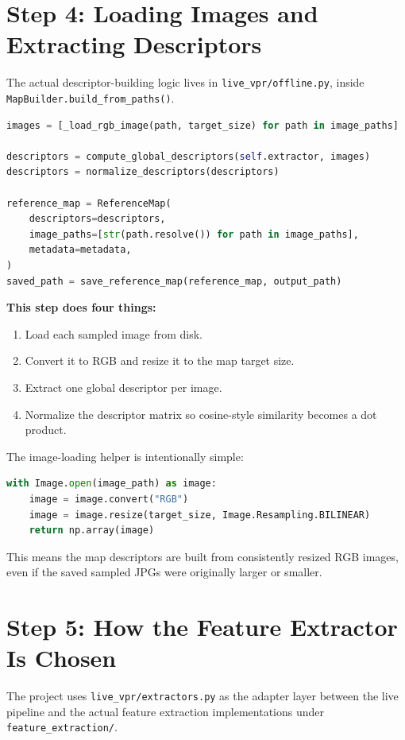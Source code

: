 \documentclass[11pt]{article}
\newcommand{\file}[1]{\texttt{#1}}
\newcommand{\code}[1]{\texttt{#1}}
\begin{document}
\section{Step 4: Loading Images and Extracting Descriptors}
The actual descriptor-building logic lives in \file{live\_vpr/offline.py}, inside \code{MapBuilder.build\_from\_paths()}.

\begin{lstlisting}[style=repo,language=Python,caption={Map building in \file{live\_vpr/offline.py}.}]
images = [_load_rgb_image(path, target_size) for path in image_paths]

descriptors = compute_global_descriptors(self.extractor, images)
descriptors = normalize_descriptors(descriptors)

reference_map = ReferenceMap(
    descriptors=descriptors,
    image_paths=[str(path.resolve()) for path in image_paths],
    metadata=metadata,
)
saved_path = save_reference_map(reference_map, output_path)
\end{lstlisting}

\textbf{This step does four things:}

\begin{enumerate}[leftmargin=*]
  \item Load each sampled image from disk.
  \item Convert it to RGB and resize it to the map target size.
  \item Extract one global descriptor per image.
  \item Normalize the descriptor matrix so cosine-style similarity becomes a dot product.
\end{enumerate}

The image-loading helper is intentionally simple:

\begin{lstlisting}[style=repo,language=Python,caption={Image preprocessing before descriptor extraction.}]
with Image.open(image_path) as image:
    image = image.convert("RGB")
    image = image.resize(target_size, Image.Resampling.BILINEAR)
    return np.array(image)
\end{lstlisting}

This means the map descriptors are built from consistently resized RGB images, even if the saved sampled JPGs were originally larger or smaller.

\section{Step 5: How the Feature Extractor Is Chosen}
The project uses \file{live\_vpr/extractors.py} as the adapter layer between the live pipeline and the actual feature extraction implementations under \file{feature\_extraction/}.
\end{document}
